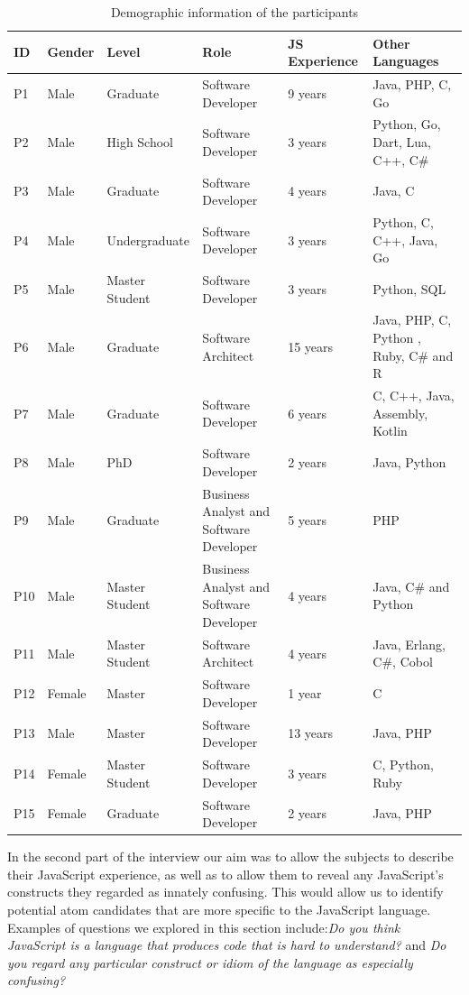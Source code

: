 \begin{table}[htb!]
\centering
\begin{tabular}
{p{0.4cm}p{0.9cm}p{2.0cm}p{6cm}p{1.9cm} p{4.5cm}}
\toprule
ID & Gender & Level & Role & JS Experience & Other Languages \\ \midrule 
P1 & Male & Graduate & Software Developer & 9 years & Java, PHP, C, Go  
\\ 
P2 & Male & High School & Software Developer & 3 years & Python, Go, Dart, Lua, C++, C\#
\\ 
P3 & Male & Graduate & Software Developer & 4 years & Java, C
\\ 
P4 & Male & Undergraduate & Software Developer & 3 years & Python, C, C++, Java, Go
\\ 
P5 & Male & Master Student & Software Developer & 3 years & Python, SQL
\\ 
P6 & Male & Graduate & Software Architect  & 15  years  & Java, PHP, C, Python , Ruby, C\# and R
\\ 
P7 & Male & Graduate & Software Developer  & 6 years & C, C++, Java, Assembly, Kotlin
\\ 
P8 & Male & PhD & Software Developer & 2 years & Java, Python
\\ 
P9 & Male & Graduate & Business Analyst and Software Developer & 5 years & PHP
\\ 
P10 & Male & Master Student & Business Analyst and Software Developer  & 4 years & Java, C\# and Python
\\ 
P11 & Male & Master Student & Software Architect & 4 years & Java, Erlang, C\#, Cobol
\\ 
P12 & Female & Master & Software Developer  & 1 year & C
\\ 
P13 & Male & Master & Software Developer & 13 years & Java, PHP
\\ 
P14 & Female & Master Student & Software Developer  & 3 years & C, Python, Ruby
\\ 
P15 & Female &  Graduate & Software Developer & 2 years & Java, PHP
\\ \bottomrule
\end{tabular}
    \caption{Demographic information of the participants}
    \label{pinterview}
\end{table}

In the second part of the interview our aim was to allow the subjects to describe
their JavaScript experience, as well as to allow them to reveal any JavaScript's constructs they regarded as innately confusing. This would allow us to identify potential atom candidates that are more specific to the JavaScript language. Examples of questions we explored in this section include:\emph{Do you think JavaScript is a language that produces code that is hard to understand?} and \emph{Do you regard any particular construct or idiom of the language as
  especially confusing?}


